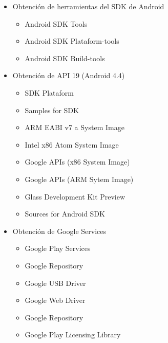 \begin{itemize}
	\item Obtención de herramientas del SDK de Android
	\begin{itemize}
		\item Android SDK Tools
		\item Android SDK Plataform-tools
		\item Android SDK Build-tools
	\end{itemize}
	\item Obtención de API 19 (Android 4.4)
	\begin{itemize}
		\item SDK Plataform
		\item Samples for SDK
		\item ARM EABI v7 a System Image
		\item Intel x86 Atom System Image
		\item Google APIs (x86 System Image)	
		\item Google APIs (ARM Sytem Image)
		\item Glass Development Kit Preview
		\item Sources for Android SDK
	\end{itemize}
	\item Obtención de Google Services
	\begin{itemize}
		\item Google Play Services
		\item Google Repository
		\item Google USB Driver
		\item Google Web Driver
		\item Google Repository
		\item Google Play Licensing Library
	\end{itemize}
\end{itemize}